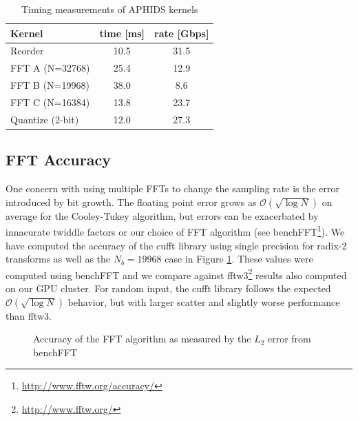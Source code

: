 \begin{table}
\begin{center}
\caption{Timing measurements of APHIDS kernels \label{tab:kernel_times}}
\begin{threeparttable}
\begin{tabular}{l|cc}
\toprule
Kernel & time [ms] & rate [Gbps] \\
\midrule
Reorder                & 10.5 & 31.5 \\
FFT A (N=32768)        & 25.4 & 12.9 \\
FFT B (N=19968)        & 38.0 & 8.6  \\
FFT C (N=16384)        & 13.8 & 23.7 \\
Quantize (2-bit)       & 12.0 & 27.3 \\
\bottomrule
\end{tabular}
\end{threeparttable}
\end{center}
\end{table}


\subsection{FFT Accuracy}
One concern with using multiple FFTs to change the sampling rate is the error introduced by bit growth.  The 
floating point error grows as $\mathcal{O}(\sqrt{\log{N}})$ \citep{schatzman96} on average for the Cooley-Tukey
algorithm, but errors can be exacerbated by innacurate twiddle factors or our choice of FFT algorithm (see
benchFFT\footnote{\url{http://www.fftw.org/accuracy/}}).  We have computed the accuracy of the cufft library 
using single precision for 
radix-2 transforms as well as the $N_b = 19968$ case in Figure \ref{fig:fft_accuracy}.  These values 
were computed using benchFFT and we compare against fftw3\footnote{\url{http://www.fftw.org/}}
results also computed on our GPU cluster.  For random input, the cufft library follows the expected 
$\mathcal{O}(\sqrt{\log{N}})$ behavior, but with larger scatter and slightly worse performance than fftw3.

\begin{figure}[t]
\caption{Accuracy of the FFT algorithm as measured by the $L_2$ error from benchFFT} \label{fig:fft_accuracy}
\end{figure}

